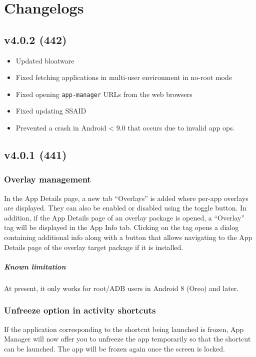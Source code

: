 \chapter{Changelogs}\label{ch:changelogs} %

\section{v4.0.2 (442)}\label{sec:v4.0.2-(442)}
\begin{itemize}
    \item Updated bloatware
    \item Fixed fetching applications in multi-user environment in no-root mode
    \item Fixed opening \texttt{app-manager} URLs from the web browsers
    \item Fixed updating SSAID
    \item Prevented a crash in Android < 9.0 that occurs due to invalid app ops.
\end{itemize}

\section{v4.0.1 (441)}\label{sec:v4.0.1-(441)}
\subsection{Overlay management}
In the App Details page, a new tab ``Overlays'' is added where per-app overlays are displayed. They
can also be enabled or disabled using the toggle button. In addition, if the App Details page of an
overlay package is opened, a ``Overlay'' tag will be displayed in the App Info tab. Clicking on the
tag opens a dialog containing additional info along with a button that allows navigating to the
App Details page of the overlay target package if it is installed.

\paragraph{Known limitation} At present, it only works for root/ADB users in Android 8 (Oreo) and
later.

\subsection{Unfreeze option in activity shortcuts}
If the application corresponding to the shortcut being launched is frozen, App Manager will now
offer you to unfreeze the app temporarily so that the shortcut can be launched. The app will be
frozen again once the screen is locked.


